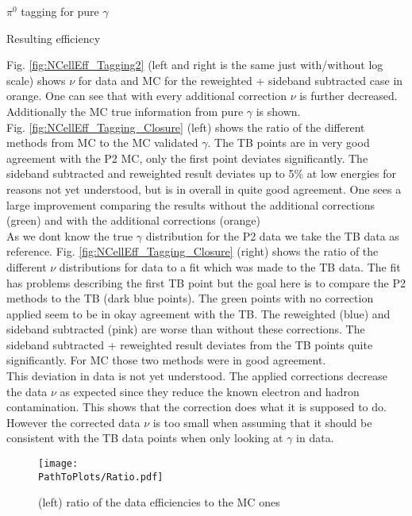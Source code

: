 \documentclass[ALICE]{ALICE_analysis_notes}
\newcommand{\PZ}{$\pi^0$\xspace}
\newcommand{\g}{$\gamma$\xspace}
\newcommand{\PathToPlots}{/home/joshua/PCG_Software/EMCal_NCellEffi/13TeVNomB_Wide/Pi0Tagging_13TeV_nom_04_26_WithTRD_WithBorderCells_1cellFT/pdf}
\begin{document}
\begin{section}{\PZ tagging for pure \g}
\begin{subsection}{Resulting efficiency}
\begin{figure}[ht!]
	\end{figure}
	
	Fig. \ref{fig:NCellEff_Tagging2} (left and right is the same just with/without log scale) shows $\nu$ for data and MC for the reweighted + sideband subtracted case in orange. One can see that with every additional correction $\nu$ is further decreased. Additionally the MC true information from pure \g is shown.\\
	Fig. \ref{fig:NCellEff_Tagging_Closure} (left) shows the ratio of the different methods from MC to the MC validated \g. The TB points are in very good agreement with the P2 MC, only the first point deviates significantly. The sideband subtracted and reweighted result deviates up to 5\% at low energies for reasons not yet understood, but is in overall in quite good agreement. One sees a large improvement comparing the results without the additional corrections (green) and with the additional corrections (orange) \\
	As we dont know the true \g distribution for the P2 data we take the TB data as reference. Fig. \ref{fig:NCellEff_Tagging_Closure} (right) shows the ratio of the different $\nu$ distributions for data to a fit which was made to the TB data. The fit has problems describing the first TB point but the goal here is to compare the P2 methods to the TB (dark blue points). The green points with no correction applied seem to be in okay agreement with the TB. The reweighted (blue) and sideband subtracted (pink) are worse than without these corrections. The sideband subtracted + reweighted result deviates from the TB points quite significantly. For MC those two methods were in good agreement.\\
	This deviation in data is not yet understood. The applied corrections decrease the data $\nu$ as expected since they reduce the known electron and hadron contamination. This shows that the correction does what it is supposed to do. However the corrected data $\nu$ is too small when assuming that it should be consistent with the TB data points when only looking at \g in data.
	
	
	\begin{figure}[ht!]
		\centering
		\texttt{[image: \\PathToPlots/Ratio.pdf]}		
		\caption{ (left) ratio of the data efficiencies to the MC ones}
		\label{fig:NCellEff_Tagging_Corr}
		
	\end{figure}
	
\end{subsection}




\end{section}
\end{document}
